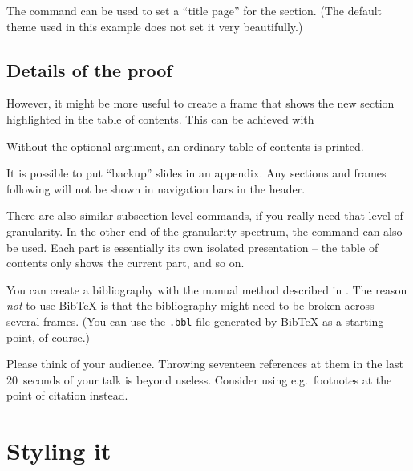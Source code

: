 The  command can be used to set a ``title page'' for the section.
(The default theme used in this example does not set it very beautifully.)
%
\begin{ExampleCode}
\section{Details of the proof}

\sectionpage
\end{ExampleCode}
%
\begin{center}
\end{center}

However, it might be more useful to create a frame that shows
the new section highlighted in the table of contents.
This can be achieved with
%
\begin{ExampleCode}
\begin{frame}
    \tableofcontents[currentsection]
\end{frame}
\end{ExampleCode}
%
Without the optional argument, an ordinary table of contents is printed.

It is possible to put ``backup'' slides in an appendix.
Any sections and frames following 
will not be shown in navigation bars in the header.

There are also similar subsection-level commands,
if you really need that level of granularity.
In the other end of the granularity spectrum,
the  command can also be used.
Each part is essentially its own isolated presentation
-- the table of contents only shows the current part, and so on.

You can create a bibliography with the manual method described in .
The reason \emph{not} to use BibTeX is that the bibliography
might need to be broken across several frames.
(You can use the \verb|.bbl| file generated by BibTeX as a starting point, of course.)

\begin{practices}
Please think of your audience.
Throwing seventeen references at them in the last 20~seconds of your talk is beyond useless.
Consider using e.g.\ footnotes at the point of citation instead.
\end{practices}




%
%
%
\section{Styling it}\label{sec:beamer styles}

